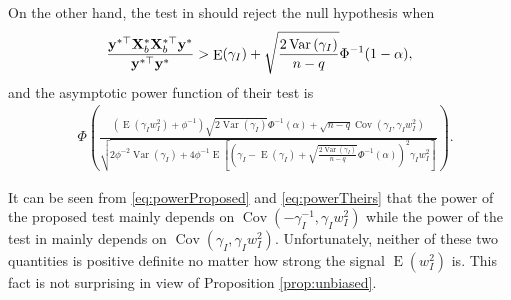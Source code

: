 \documentclass[11pt]{article}
\DeclareMathOperator{\myE}{E}
\DeclareMathOperator{\myVar}{Var}
\DeclareMathOperator{\myCov}{Cov}
\newcommand{\By}{\mathbf{y}}    \newcommand{\Bz}{\mathbf{z}}
\theoremstyle{plain}
\theoremstyle{definition}
\theoremstyle{remark}
\begin{document}
On the other hand, the test in \cite{Goeman2006} should reject the null hypothesis when
\begin{equation*}
        \frac{
            \By^{*\top} \BX_b^* \BX_b^{*\top} \By^*
        }{
            \By^{*\top} \By^*
        } 
        >
        \myE (\gamma_I)
        +\sqrt{
            \frac{2\myVar\left( \gamma_I \right)}{n-q} 
        }
        \Phi^{-1}(1-\alpha),
\end{equation*}
and the asymptotic power function of their test is
\begin{equation}\label{eq:powerTheirs}
    \begin{split}
    &\Phi\left( 
        \frac{
            \left( \myE (\gamma_I w_I^2) + \phi^{-1} \right)
            \sqrt{2\myVar\left( \gamma_I \right)} 
            \Phi^{-1}(\alpha)
            +
            \sqrt{n-q}
            \myCov\left( \gamma_I, \gamma_I w_I^2 \right)
        }{
            \sqrt{
                2\phi^{-2} \myVar ( \gamma_I ) 
                +
                4\phi^{-1}
    \myE\left[ 
        \left( \gamma_I -\myE(\gamma_I) +\sqrt{\frac{2\myVar (\gamma_I)}{n-q}} \Phi^{-1}(\alpha) \right)^2
        \gamma_I w_I^2
    \right]
            }
        } 
    \right).
    \end{split}
\end{equation}

It can be seen from \eqref{eq:powerProposed} and \eqref{eq:powerTheirs} that the power of the proposed test mainly depends on $\myCov (-\gamma_I^{-1}, \gamma_I w_I^2)$ while the power of the test in \cite{Goeman2006} mainly depends on $\myCov(\gamma_I, \gamma_I w_I^2)$.  
Unfortunately, neither of these two quantities is positive definite no matter how strong the signal $\myE (w_I^2)$ is.
This fact is not surprising in view of Proposition \ref{prop:unbiased}.
\end{document}
